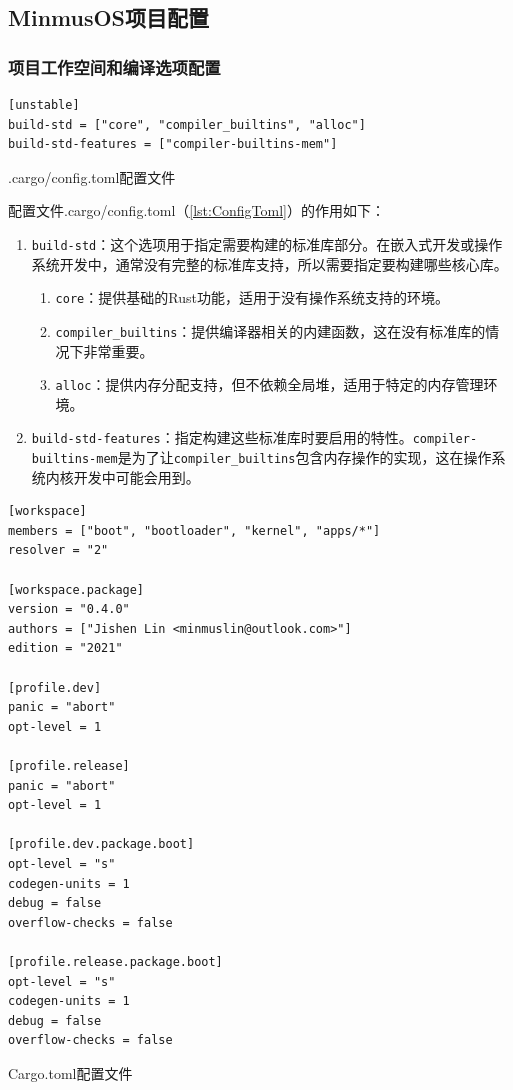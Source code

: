 \subsection{MinmusOS项目配置}

\subsubsection{项目工作空间和编译选项配置}

\begin{listing}[htbp]
    \begin{verbatim}
[unstable]
build-std = ["core", "compiler_builtins", "alloc"]
build-std-features = ["compiler-builtins-mem"]
    \end{verbatim}
    \caption{.cargo/config.toml配置文件}\label{lst:ConfigToml}
\end{listing}

配置文件.cargo/config.toml（\cref{lst:ConfigToml}）的作用如下：

\begin{enumerate}
    \item \texttt{build-std}：这个选项用于指定需要构建的标准库部分。在嵌入式开发或操作系统开发中，通常没有完整的标准库支持，所以需要指定要构建哪些核心库。
          \begin{enumerate}
              \item \texttt{core}：提供基础的Rust功能，适用于没有操作系统支持的环境。
              \item \texttt{compiler\_builtins}：提供编译器相关的内建函数，这在没有标准库的情况下非常重要。
              \item \texttt{alloc}：提供内存分配支持，但不依赖全局堆，适用于特定的内存管理环境。
          \end{enumerate}
    \item \texttt{build-std-features}：指定构建这些标准库时要启用的特性。\texttt{compiler-builtins-mem}是为了让\texttt{compiler\_builtins}包含内存操作的实现，这在操作系统内核开发中可能会用到。
\end{enumerate}

\begin{listing}[htbp]
    \begin{verbatim}
[workspace]
members = ["boot", "bootloader", "kernel", "apps/*"]
resolver = "2"

[workspace.package]
version = "0.4.0"
authors = ["Jishen Lin <minmuslin@outlook.com>"]
edition = "2021"

[profile.dev]
panic = "abort"
opt-level = 1

[profile.release]
panic = "abort"
opt-level = 1

[profile.dev.package.boot]
opt-level = "s"
codegen-units = 1
debug = false
overflow-checks = false

[profile.release.package.boot]
opt-level = "s"
codegen-units = 1
debug = false
overflow-checks = false
    \end{verbatim}
    \caption{Cargo.toml配置文件}\label{lst:CargoToml}
\end{listing}

